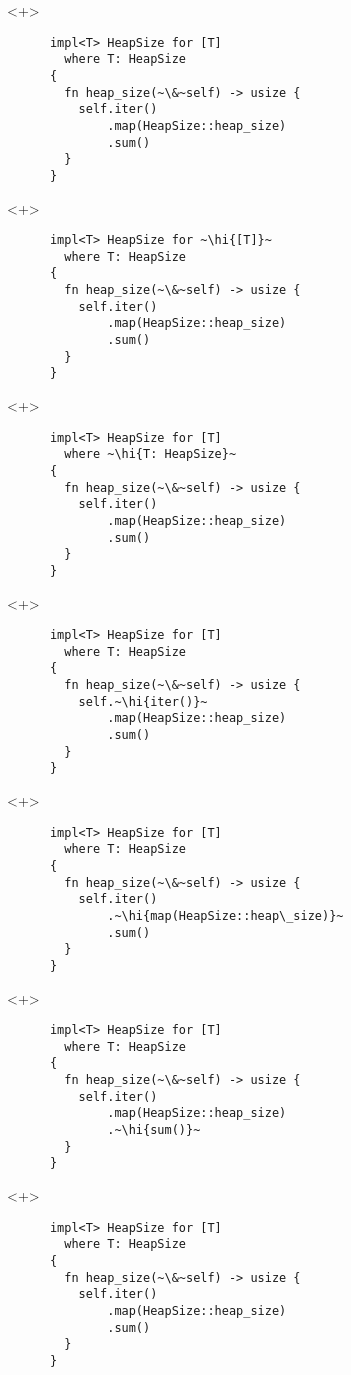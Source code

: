 \documentclass[usepdftitle=false]{beamer}
\renewcommand{\&}{\makebox[\widthof{\ampersand}][c]{\scalebox{0.9}[1.0]{\Book\ampersand}}}
\newcommand{\+}{\makebox[\widthof{+}][c]{\raisebox{-.2\height}{\scalefont{1.5}\Light+}}}
\newcommand{\hi}[1]{%
\tikz[baseline=(A.base)]
 \node[highlighting=0,inner sep=0pt,text depth=0pt] (A) {#1};%
}
\begin{document}
\begin{frame}[fragile]
  \begin{onlyenv}<+>
    \begin{verbatim}
      impl<T> HeapSize for [T]
        where T: HeapSize
      {
        fn heap_size(~\&~self) -> usize {
          self.iter()
              .map(HeapSize::heap_size)
              .sum()
        }
      }
    \end{verbatim}
  \end{onlyenv}
  \begin{onlyenv}<+>
    \begin{verbatim}
      impl<T> HeapSize for ~\hi{[T]}~
        where T: HeapSize
      {
        fn heap_size(~\&~self) -> usize {
          self.iter()
              .map(HeapSize::heap_size)
              .sum()
        }
      }
    \end{verbatim}
  \end{onlyenv}
  \begin{onlyenv}<+>
    \begin{verbatim}
      impl<T> HeapSize for [T]
        where ~\hi{T: HeapSize}~
      {
        fn heap_size(~\&~self) -> usize {
          self.iter()
              .map(HeapSize::heap_size)
              .sum()
        }
      }
    \end{verbatim}
  \end{onlyenv}
  \begin{onlyenv}<+>
    \begin{verbatim}
      impl<T> HeapSize for [T]
        where T: HeapSize
      {
        fn heap_size(~\&~self) -> usize {
          self.~\hi{iter()}~
              .map(HeapSize::heap_size)
              .sum()
        }
      }
    \end{verbatim}
  \end{onlyenv}
  \begin{onlyenv}<+>
    \begin{verbatim}
      impl<T> HeapSize for [T]
        where T: HeapSize
      {
        fn heap_size(~\&~self) -> usize {
          self.iter()
              .~\hi{map(HeapSize::heap\_size)}~
              .sum()
        }
      }
    \end{verbatim}
  \end{onlyenv}
  \begin{onlyenv}<+>
    \begin{verbatim}
      impl<T> HeapSize for [T]
        where T: HeapSize
      {
        fn heap_size(~\&~self) -> usize {
          self.iter()
              .map(HeapSize::heap_size)
              .~\hi{sum()}~
        }
      }
    \end{verbatim}
  \end{onlyenv}
  \begin{onlyenv}<+>
    \begin{verbatim}
      impl<T> HeapSize for [T]
        where T: HeapSize
      {
        fn heap_size(~\&~self) -> usize {
          self.iter()
              .map(HeapSize::heap_size)
              .sum()
        }
      }
    \end{verbatim}
  \end{onlyenv}
\end{frame}
\end{document}
